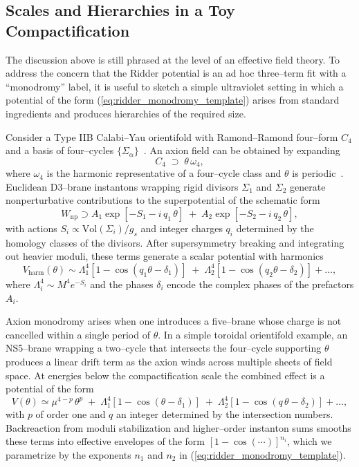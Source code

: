 \documentclass[a4paper,11pt]{article}
\begin{document}
\subsection{Scales and Hierarchies in a Toy Compactification}
\label{sec:toy_uv}

The discussion above is still phrased at the level of an effective field theory. To address the concern that the Ridder potential is an ad hoc three–term fit with a ``monodromy'' label, it is useful to sketch a simple ultraviolet setting in which a potential of the form (\ref{eq:ridder_monodromy_template}) arises from standard ingredients and produces hierarchies of the required size.

Consider a Type IIB Calabi–Yau orientifold with Ramond–Ramond four–form $C_4$ and a basis of four–cycles $\{\Sigma_{\alpha}\}$~\cite{GKP, KKLT}. An axion field can be obtained by expanding
\begin{equation}
    C_4 \;\supset\; \theta\,\omega_4,
\end{equation}
where $\omega_4$ is the harmonic representative of a four–cycle class and $\theta$ is periodic~\cite{Svrcek_Witten}. Euclidean D3–brane instantons wrapping rigid divisors $\Sigma_1$ and $\Sigma_2$ generate nonperturbative contributions to the superpotential of the schematic form
\begin{equation}
    W_{\text{np}} \supset A_1 \exp\!\left[-S_1 - i\,q_1\,\theta\right] \;+\; A_2 \exp\!\left[-S_2 - i\,q_2\,\theta\right],
\end{equation}
with actions $S_i \propto \text{Vol}(\Sigma_i) / g_s$ and integer charges $q_i$ determined by the homology classes of the divisors. After supersymmetry breaking and integrating out heavier moduli, these terms generate a scalar potential with harmonics
\begin{equation}
    V_{\text{harm}}(\theta) \sim \Lambda_1^4 \left[1 - \cos(q_1 \theta - \delta_1)\right] \;+\; \Lambda_2^4 \left[1 - \cos(q_2 \theta - \delta_2)\right] + \ldots,
\end{equation}
where $\Lambda_i^4 \sim M^4 e^{-S_i}$ and the phases $\delta_i$ encode the complex phases of the prefactors $A_i$.

Axion monodromy arises when one introduces a five–brane whose charge is not cancelled within a single period of $\theta$. In a simple toroidal orientifold example, an NS5–brane wrapping a two–cycle that intersects the four–cycle supporting $\theta$ produces a linear drift term as the axion winds across multiple sheets of field space. At energies below the compactification scale the combined effect is a potential of the form
\begin{equation}
    V(\theta) \simeq \mu^{4-p}\,\theta^{p} \;+\; \Lambda_1^4 \left[1 - \cos(\theta - \delta_1)\right] \;+\; \Lambda_2^4 \left[1 - \cos(q\,\theta - \delta_2)\right] + \ldots,
\end{equation}
with $p$ of order one and $q$ an integer determined by the intersection numbers. Backreaction from moduli stabilization and higher–order instanton sums smooths these terms into effective envelopes of the form $[1 - \cos(\cdots)]^{n_i}$, which we parametrize by the exponents $n_1$ and $n_2$ in (\ref{eq:ridder_monodromy_template}).
\end{document}
